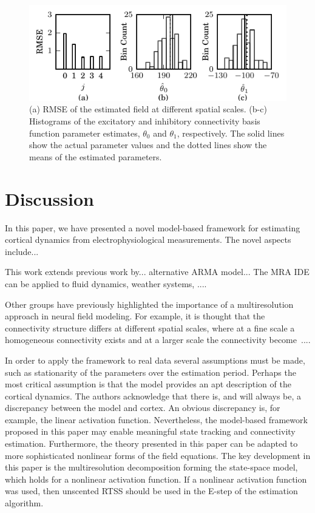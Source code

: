 \documentclass[journal,a4paper]{IEEEtran}
\begin{document}
\begin{figure}[!h] 
 \centering
 \includegraphics[scale=1]{./Graph/Hist.pdf}
 \caption{(a) RMSE of the estimated field at different spatial scales. (b-c) Histograms of the excitatory and inhibitory connectivity basis function parameter estimates, $\theta_0$ and $\theta_1$, respectively. The solid lines show the actual parameter values and the dotted lines show the means of the estimated parameters.}
 \label{fig:ParametersHistogram}
 \end{figure} 

\section{Discussion}
In this paper, we have presented a novel model-based framework for estimating cortical dynamics from electrophysiological measurements. The novel aspects include...

This work extends previous work by... alternative ARMA model... The MRA IDE can be applied to fluid dynamics, weather systems, ....

Other groups have previously highlighted the importance of a multiresolution approach in neural field modeling. For example, it is thought that the connectivity structure differs at different spatial scales, where at a fine scale a homogeneous connectivity exists and at a larger scale the connectivity become~\cite{Qubbaj2009}....

In order to apply the framework to real data several assumptions must be made, such as stationarity of the parameters over the estimation period. Perhaps the most critical assumption is that the model provides an apt description of the cortical dynamics. The authors acknowledge that there is, and will always be, a discrepancy between the model and cortex. An obvious discrepancy is, for example, the linear activation function. Nevertheless, the model-based framework proposed in this paper may enable meaningful state tracking and connectivity estimation. Furthermore, the theory presented in this paper can be adapted to more sophisticated nonlinear forms of the field equations. The key development in this paper is the multiresolution decomposition forming the state-space model, which holds for a nonlinear activation function. If a nonlinear activation function was used, then unscented RTSS should be used in the E-step of the estimation algorithm. 
\end{document}
